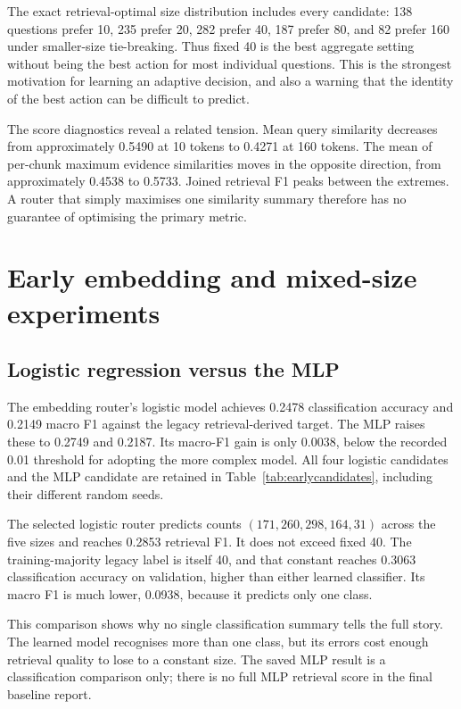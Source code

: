 The exact retrieval-optimal size distribution includes every candidate:
138 questions prefer 10, 235 prefer 20, 282 prefer 40, 187 prefer 80,
and 82 prefer 160 under smaller-size tie-breaking. Thus fixed 40 is
the best aggregate setting without being the best action for most
individual questions. This is the strongest motivation for learning
an adaptive decision, and also a warning that the identity of the
best action can be difficult to predict.

The score diagnostics reveal a related tension. Mean query similarity
decreases from approximately 0.5490 at 10 tokens to 0.4271 at 160
tokens. The mean of per-chunk maximum evidence similarities moves in the opposite direction,
from approximately 0.4538 to 0.5733. Joined retrieval F1 peaks between
the extremes. A router that simply maximises one similarity summary
therefore has no guarantee of optimising the primary metric.

\section{Early embedding and mixed-size experiments}
\subsection{Logistic regression versus the MLP}
The embedding router's logistic model achieves 0.2478 classification
accuracy and 0.2149 macro F1 against the legacy retrieval-derived
target. The MLP raises these to 0.2749 and 0.2187. Its macro-F1 gain
is only 0.0038, below the recorded 0.01 threshold for adopting the
more complex model.
All four logistic candidates and the MLP candidate are retained in
Table~\ref{tab:earlycandidates}, including their different random seeds.

The selected logistic router predicts counts
$(171,260,298,164,31)$ across the five sizes and reaches 0.2853
retrieval F1. It does not exceed fixed 40. The training-majority
legacy label is itself 40, and that constant reaches 0.3063
classification accuracy on validation, higher than either learned
classifier. Its macro F1 is much lower, 0.0938, because it predicts
only one class.

This comparison shows why no single classification summary tells
the full story. The learned model recognises more than one class,
but its errors cost enough retrieval quality to lose to a constant
size. The saved MLP result is a classification comparison only;
there is no full MLP retrieval score in the final baseline report.

